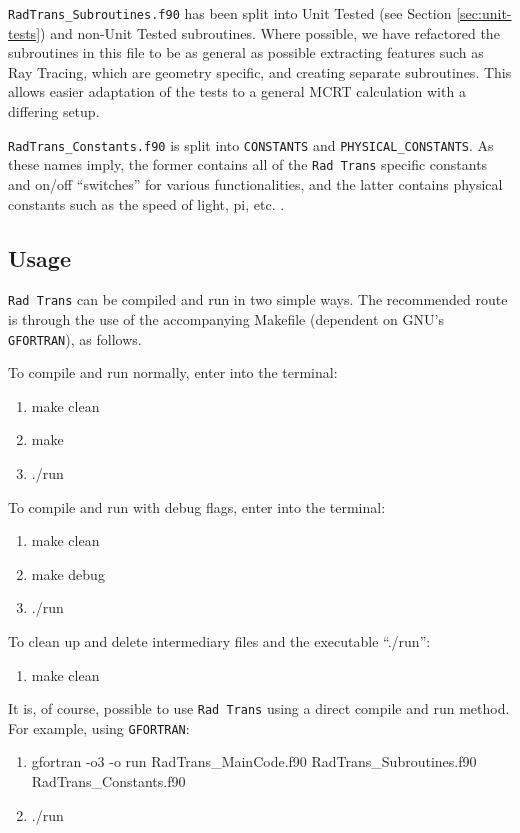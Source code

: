 \verb|RadTrans_Subroutines.f90| has been split into Unit Tested (see Section \ref{sec:unit-tests}) and non-Unit Tested subroutines. Where possible, we have refactored the subroutines in this file to be as general as possible extracting features such as Ray Tracing, which are geometry specific, and creating separate subroutines. This allows easier adaptation of the tests to a general MCRT calculation with a differing setup.

\verb|RadTrans_Constants.f90| is split into \verb|CONSTANTS| and \verb|PHYSICAL_CONSTANTS|. As these names imply, the former contains all of the \verb|Rad Trans| specific constants and on/off ``switches'' for various functionalities, and the latter contains physical constants such as the speed of light, pi, etc. .


\subsection{Usage}
\label{subsec:rt-usage}
\verb|Rad Trans| can be compiled and run in two simple ways. The recommended route is through the use of the accompanying Makefile (dependent on GNU's \verb|GFORTRAN|), as follows.

To compile and run normally, enter into the terminal:
\begin{enumerate}
    \item make clean
    \item make
    \item ./run
\end{enumerate}

To compile and run with debug flags, enter into the terminal:
\begin{enumerate}
    \item make clean
    \item make debug
    \item ./run
\end{enumerate}

To clean up and delete intermediary files and the executable ``./run'':
\begin{enumerate}
    \item make clean
\end{enumerate}


It is, of course, possible to use \verb|Rad Trans| using a direct compile and run method. For example, using \verb|GFORTRAN|:

\begin{enumerate}
    \item gfortran -o3 -o run RadTrans\_MainCode.f90 RadTrans\_Subroutines.f90 RadTrans\_Constants.f90  
    \item ./run
\end{enumerate}


